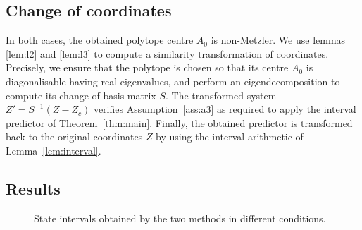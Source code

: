 \documentclass[twocolumn,english]{IEEEtran}
\theoremstyle{plain}
\theoremstyle{definition}
\theoremstyle{plain}
\theoremstyle{plain}
\theoremstyle{remark}
\begin{document}
\subsection{Change of coordinates}
In both cases, the obtained polytope centre $A_0$ is non-Metzler.
We use lemmas \ref{lem:l2} and \ref{lem:l3} to compute a similarity transformation of coordinates. Precisely, we ensure that the polytope is chosen so that its centre $A_0$ is diagonalisable having real eigenvalues, and perform an eigendecomposition to compute its change of basis matrix $S$. The transformed system $Z'=S^{-1}(Z-Z_c)$ verifies Assumption~\ref{ass:a3} as required to apply the interval predictor of Theorem~\ref{thm:main}. Finally, the obtained predictor is transformed back to the original coordinates $Z$ by using the interval arithmetic of Lemma~\ref{lem:interval}.

\subsection{Results}

\begin{figure}[htp]
    \newline
\newline
\newline
    \caption{State intervals obtained by the two methods in different conditions.}
    \label{fig:highway}
\end{figure}
\end{document}

